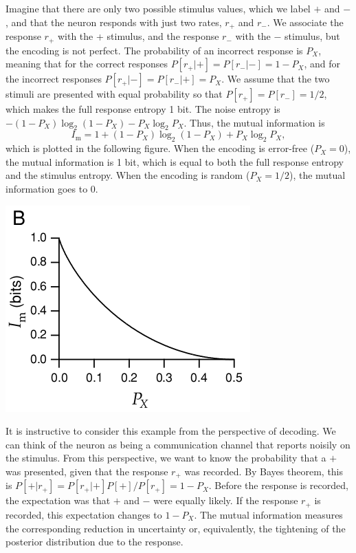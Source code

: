 \begin{exm}
  Imagine that there are only two possible stimulus values, which we label $+$ and $-$, and that the neuron responds with just two rates, $r_+$ and $r_-$. We associate the response $r_+$ with the + stimulus, and the response $r_-$ with the $-$ stimulus, but the encoding is not perfect. The probability of an incorrect response is $P_X$, meaning that for the correct responses $P[r_+|+]=P[r_-|-]=1-P_X$, and for the incorrect responses $P[r_+|-]=P[r_-|+]=P_X$. We assume that the two stimuli are presented with equal probability so that $P[r_+]=P[r_-]=1/2$, which makes the full response entropy 1 bit. The noise entropy is $-(1-P_{X})\log_2(1-P_X)-P_X\log_2 P_X$. Thus, the mutual information is
  \begin{equation}
    \label{equ:4.14}
    I_{\text{m}}=1+(1-P_X)\log_2(1 - P_X) + P_X\log_{2} P_X,
  \end{equation}
  which is plotted in the following figure. When the encoding is error-free ($P_X=0$),
  the mutual information is 1 bit, which is equal to both the full response
  entropy and the stimulus entropy. When the encoding is random ($P_X = 1/2$), the mutual information goes to 0.
  \begin{center}
    \label{fig:4-1B}
    \includegraphics[scale = 0.4]{./png/4-1B}
  \end{center}
\end{exm}

\begin{rem}
  It is instructive to consider this example from the perspective of decoding. We can think of the neuron as being a communication channel that reports noisily on the stimulus. From this perspective, we want to know the probability that a $+$ was presented, given that the response $r_+$ was recorded. By Bayes theorem, this is $P[+|r_+] = P[r_+|+]P[+]/P[r_+] = 1 - P_X$. Before the response is recorded, the expectation was that $+$ and $-$ were equally likely. If the response $r_+$ is recorded, this expectation changes to $1 - P_X$. The mutual information measures the corresponding reduction in uncertainty or, equivalently, the tightening of the posterior distribution due to the response.
\end{rem}


